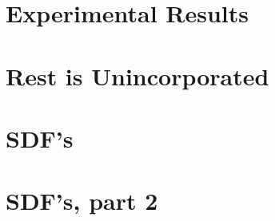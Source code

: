 \documentclass{book}
\begin{document}
  \section{Experimental Results}

  \section{Rest is Unincorporated}

  \section{SDF's}
    

  \section{SDF's, part 2}
    


%     
%     
%     
%    

%     

%     
%     
%     
%     





\backmatter

% 



\printindex
\end{document}
